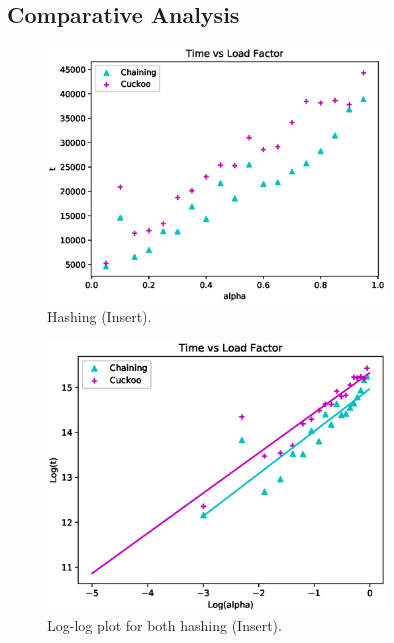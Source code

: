 \documentclass{article}
\begin{document}
\begin{spacing}{1.2}
\section{Comparative Analysis}
\begin{figure}[!htb]
    \centering
    \includegraphics[width=0.8\textwidth]{../output/fig/insert_original.eps}
    \caption{Hashing (Insert).}
    \label{insert-origin}
\end{figure}

\begin{figure}[!htb]
    \centering
    \includegraphics[width=0.8\textwidth]{../output/fig/insert.eps}
    \caption{Log-log plot for both hashing (Insert).}
    \label{insert}
\end{figure}

\end{spacing}
\end{document}

